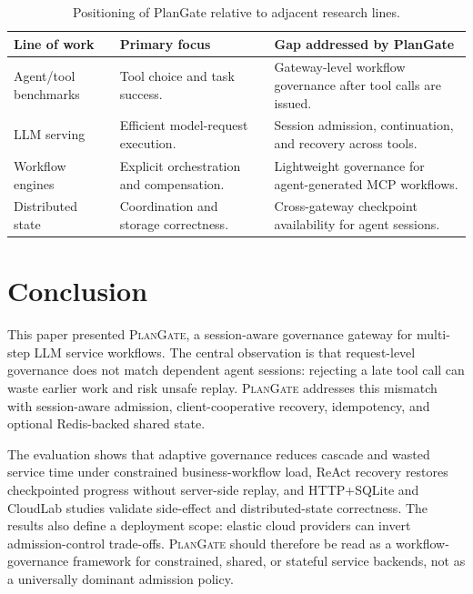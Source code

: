 \documentclass[5p,times]{elsarticle}
\newcommand{\plangate}{\textsc{PlanGate}\xspace}
\begin{document}
\begin{table}[t]
\centering
\caption{Positioning of PlanGate relative to adjacent research lines.}
\label{tab:related_positioning}
\footnotesize
\begin{tabular}{@{}>{\raggedright\arraybackslash}p{}>{\raggedright\arraybackslash}p{}>{\raggedright\arraybackslash}p{}@{}}
\toprule
\textbf{Line of work} & \textbf{Primary focus} & \textbf{Gap addressed by PlanGate} \\
\midrule
Agent/tool benchmarks & Tool choice and task success. & Gateway-level workflow governance after tool calls are issued. \\
LLM serving & Efficient model-request execution. & Session admission, continuation, and recovery across tools. \\
Workflow engines & Explicit orchestration and compensation. & Lightweight governance for agent-generated MCP workflows. \\
Distributed state & Coordination and storage correctness. & Cross-gateway checkpoint availability for agent sessions. \\
\bottomrule
\end{tabular}
\end{table}

\section{Conclusion}
\label{sec:conclusion}

This paper presented \plangate, a session-aware governance gateway for multi-step LLM service workflows. The central observation is that request-level governance does not match dependent agent sessions: rejecting a late tool call can waste earlier work and risk unsafe replay. \plangate addresses this mismatch with session-aware admission, client-cooperative recovery, idempotency, and optional Redis-backed shared state.

The evaluation shows that adaptive governance reduces cascade and wasted service time under constrained business-workflow load, ReAct recovery restores checkpointed progress without server-side replay, and HTTP+SQLite and CloudLab studies validate side-effect and distributed-state correctness. The results also define a deployment scope: elastic cloud providers can invert admission-control trade-offs. \plangate should therefore be read as a workflow-governance framework for constrained, shared, or stateful service backends, not as a universally dominant admission policy.
\end{document}
